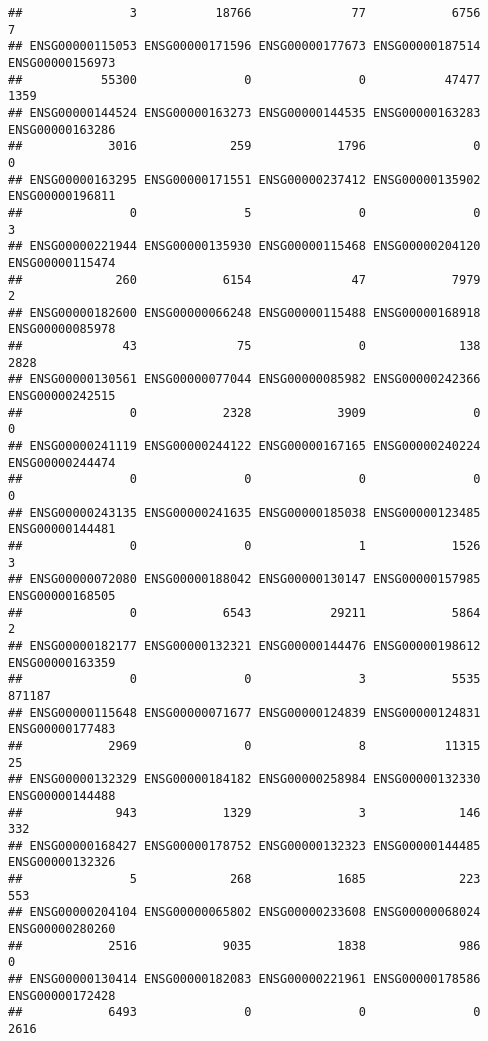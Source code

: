 \documentclass[
]{article}
\begin{document}
\begin{verbatim}
##               3           18766              77            6756               7 
## ENSG00000115053 ENSG00000171596 ENSG00000177673 ENSG00000187514 ENSG00000156973 
##           55300               0               0           47477            1359 
## ENSG00000144524 ENSG00000163273 ENSG00000144535 ENSG00000163283 ENSG00000163286 
##            3016             259            1796               0               0 
## ENSG00000163295 ENSG00000171551 ENSG00000237412 ENSG00000135902 ENSG00000196811 
##               0               5               0               0               3 
## ENSG00000221944 ENSG00000135930 ENSG00000115468 ENSG00000204120 ENSG00000115474 
##             260            6154              47            7979               2 
## ENSG00000182600 ENSG00000066248 ENSG00000115488 ENSG00000168918 ENSG00000085978 
##              43              75               0             138            2828 
## ENSG00000130561 ENSG00000077044 ENSG00000085982 ENSG00000242366 ENSG00000242515 
##               0            2328            3909               0               0 
## ENSG00000241119 ENSG00000244122 ENSG00000167165 ENSG00000240224 ENSG00000244474 
##               0               0               0               0               0 
## ENSG00000243135 ENSG00000241635 ENSG00000185038 ENSG00000123485 ENSG00000144481 
##               0               0               1            1526               3 
## ENSG00000072080 ENSG00000188042 ENSG00000130147 ENSG00000157985 ENSG00000168505 
##               0            6543           29211            5864               2 
## ENSG00000182177 ENSG00000132321 ENSG00000144476 ENSG00000198612 ENSG00000163359 
##               0               0               3            5535          871187 
## ENSG00000115648 ENSG00000071677 ENSG00000124839 ENSG00000124831 ENSG00000177483 
##            2969               0               8           11315              25 
## ENSG00000132329 ENSG00000184182 ENSG00000258984 ENSG00000132330 ENSG00000144488 
##             943            1329               3             146             332 
## ENSG00000168427 ENSG00000178752 ENSG00000132323 ENSG00000144485 ENSG00000132326 
##               5             268            1685             223             553 
## ENSG00000204104 ENSG00000065802 ENSG00000233608 ENSG00000068024 ENSG00000280260 
##            2516            9035            1838             986               0 
## ENSG00000130414 ENSG00000182083 ENSG00000221961 ENSG00000178586 ENSG00000172428 
##            6493               0               0               0            2616 

\end{verbatim}
\end{document}
